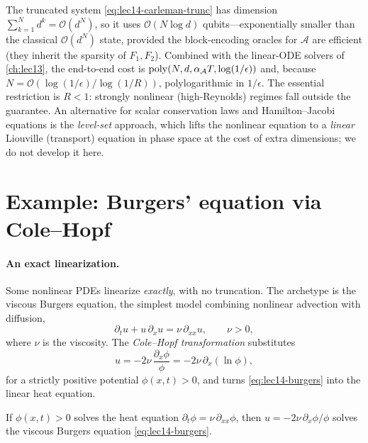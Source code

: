 \begin{remark}
\label{rem:lec14-carleman-cost}
The truncated system \eqref{eq:lec14-carleman-trunc} has dimension $\sum_{k=1}^N d^k=\mathcal O
(d^N)$, so it uses $\mathcal O(N\log d)$ qubits---exponentially smaller than the classical
$\mathcal O(d^N)$ state, provided the block-encoding oracles for $\mathcal A$ are efficient (they
inherit the sparsity of $F_1,F_2$). Combined with the linear-ODE solvers of \cref{ch:lec13}, the
end-to-end cost is $\operatorname{poly}(N,d,\alpha_{\mathcal A}T,\log(1/\epsilon))$ and, because $N=\mathcal O
(\log(1/\epsilon)/\log(1/R))$, polylogarithmic in $1/\epsilon$. The essential restriction is
$R<1$: strongly nonlinear (high-Reynolds) regimes fall outside the guarantee. An alternative for
scalar conservation laws and Hamilton--Jacobi equations is the \emph{level-set} approach, which
lifts the nonlinear equation to a \emph{linear} Liouville (transport) equation in phase space at
the cost of extra dimensions; we do not develop it here.
\end{remark}

\section{Example: Burgers' equation via Cole--Hopf}
\label{sec:lec14-5}

\paragraph{An exact linearization.}
Some nonlinear PDEs linearize \emph{exactly}, with no truncation. The archetype is the viscous
Burgers equation, the simplest model combining nonlinear advection with diffusion,
\begin{equation}
  \partial_t u+u\,\partial_x u=\nu\,\partial_{xx}u,\qquad \nu>0,
  \label{eq:lec14-burgers}
\end{equation}
where $\nu$ is the viscosity. The \emph{Cole--Hopf transformation} substitutes
\begin{equation}
  u=-2\nu\,\frac{\partial_x\phi}{\phi}=-2\nu\,\partial_x(\ln\phi),
  \label{eq:lec14-colehopf}
\end{equation}
for a strictly positive potential $\phi(x,t)>0$, and turns \eqref{eq:lec14-burgers} into the
linear heat equation.

\begin{theorem}
\label{thm:lec14-colehopf}
If $\phi(x,t)>0$ solves the heat equation $\partial_t\phi=\nu\,\partial_{xx}\phi$, then
$u=-2\nu\,\partial_x\phi/\phi$ solves the viscous Burgers equation \eqref{eq:lec14-burgers}.
\end{theorem}

